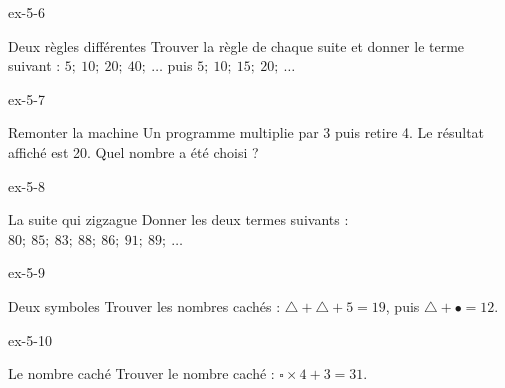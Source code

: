 \begin{blocLivre}{ex-5-6}\begin{exercice}[2]{Deux règles différentes}
Trouver la règle de chaque suite et donner le terme suivant : $5 ;\ 10 ;\ 20 ;\ 40 ;\ \ldots$ puis $5 ;\ 10 ;\ 15 ;\ 20 ;\ \ldots$
\end{exercice}\end{blocLivre}
\begin{blocLivre}{ex-5-7}\begin{exercice}[2]{Remonter la machine}
Un programme multiplie par 3 puis retire 4. Le résultat affiché est 20. Quel nombre a été choisi ?
\end{exercice}\end{blocLivre}
\begin{blocLivre}{ex-5-8}\begin{exercice}[2]{La suite qui zigzague}
Donner les deux termes suivants : $80 ;\ 85 ;\ 83 ;\ 88 ;\ 86 ;\ 91 ;\ 89 ;\ \ldots$
\end{exercice}\end{blocLivre}
\begin{blocLivre}{ex-5-9}\begin{exercice}[2]{Deux symboles}
Trouver les nombres cachés : $\triangle+\triangle+5=19$, puis $\triangle+\bullet=12$.
\end{exercice}\end{blocLivre}
\begin{blocLivre}{ex-5-10}\begin{exercice}[2]{Le nombre caché}
Trouver le nombre caché : $\square\times4+3=31$.
\end{exercice}\end{blocLivre}

